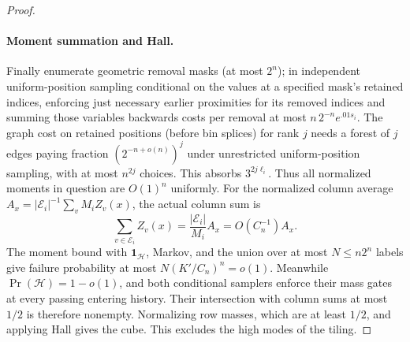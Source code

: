 \begin{proof}
\paragraph{Moment summation and Hall.}
Finally enumerate geometric removal masks (at most \(2^n\)); in independent uniform-position sampling conditional on the values at a specified mask's retained indices, enforcing just necessary earlier proximities for its removed indices and summing those variables backwards costs per removal at most \(n\,2^{-n}e^{.01s_i}\). The graph cost on retained positions (before bin splices) for rank \(j\) needs a forest of \(j\) edges paying fraction \((2^{-n+o(n)})^j\) under unrestricted uniform-position sampling, with at most \(n^{2j}\) choices. This absorbs \(3^{2j\ell_i}\). Thus all normalized moments in question are \(O(1)^n\) uniformly. For the normalized column average \(A_x=|\mathcal E_i|^{-1}\sum_v M_iZ_v(x)\), the actual column sum is
\[
 \sum_{v\in\mathcal E_i}Z_v(x)
   =\frac{|\mathcal E_i|}{M_i}A_x=O(C_n^{-1})A_x.
\]
The moment bound with \(\mathbf1_{\mathcal H}\), Markov, and the union over at most \(N\le n2^n\) labels give failure probability at most \(N(K'/C_n)^n=o(1)\). Meanwhile \(\Pr(\mathcal H)=1-o(1)\), and both conditional samplers enforce their mass gates at every passing entering history. Their intersection with column sums at most \(1/2\) is therefore nonempty. Normalizing row masses, which are at least \(1/2\), and applying Hall gives the cube. This excludes the high modes of the tiling.
\end{proof}
